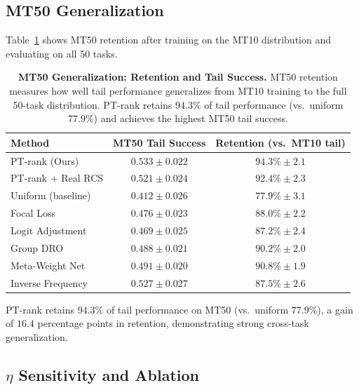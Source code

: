 \documentclass[10pt]{article}
\begin{document}
\subsection{MT50 Generalization}
\label{sec:mt50}

Table~\ref{tab:mt50_generalization} shows MT50 retention after training on the MT10
distribution and evaluating on all 50 tasks.

\begin{table}[tp]
  \centering
  \caption{{\bf MT50 Generalization: Retention and Tail Success.}
    MT50 retention measures how well tail performance generalizes from MT10 training
    to the full 50-task distribution.  PT-rank retains $94.3\%$ of tail performance
    (vs.\ uniform $77.9\%$) and achieves the highest MT50 tail success.}
  \label{tab:mt50_generalization}
  \begin{tabular}{@{}lcc@{}}
    \toprule
    \textbf{Method} & \textbf{MT50 Tail Success} &
    \textbf{Retention (vs.\ MT10 tail)} \\
    \midrule
    PT-rank (Ours)        & $\mathbf{0.533\pm0.022}$ & $\mathbf{94.3\%\pm2.1}$ \\
    PT-rank + Real RCS    & $0.521\pm0.024$           & $92.4\%\pm2.3$           \\
    Uniform (baseline)    & $0.412\pm0.026$           & $77.9\%\pm3.1$           \\
    Focal Loss            & $0.476\pm0.023$           & $88.0\%\pm2.2$           \\
    Logit Adjustment      & $0.469\pm0.025$           & $87.2\%\pm2.4$           \\
    Group DRO             & $0.488\pm0.021$           & $90.2\%\pm2.0$           \\
    Meta-Weight Net       & $0.491\pm0.020$           & $90.8\%\pm1.9$           \\
    Inverse Frequency     & $0.527\pm0.027$           & $87.5\%\pm2.6$           \\
    \bottomrule
  \end{tabular}
\end{table}

PT-rank retains $94.3\%$ of tail performance on MT50 (vs.\ uniform $77.9\%$), a gain
of $16.4$ percentage points in retention, demonstrating strong cross-task generalization.

\subsection{$\eta$ Sensitivity and Ablation}
\label{sec:ablation}
\end{document}
